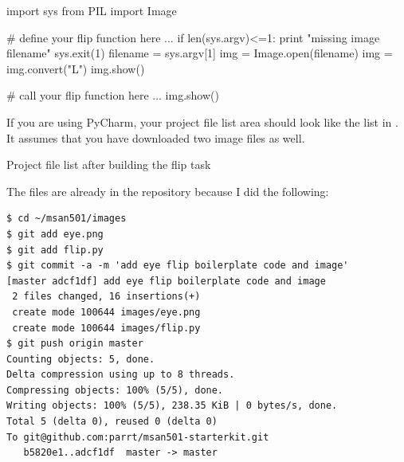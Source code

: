 \begin{pyverbatim}
import sys
from PIL import Image

# define your flip function here
...
if len(sys.argv)<=1:
	print "missing image filename"
	sys.exit(1)
filename = sys.argv[1]
img = Image.open(filename)
img = img.convert("L")
img.show()

# call your flip function here
...
img.show()
\end{pyverbatim}

If you are using PyCharm, your project file list area should look like the list in . It assumes that you have downloaded two image files as well.

\begin{marginfigure}
\begin{center}
\end{center}
\caption{Project file list after building the flip task}
\label{fliplist}
\end{marginfigure}

The files are already in the repository because I did the following:

\begin{lstlisting}[style=BashInputStyle]
$ cd ~/msan501/images
$ git add eye.png
$ git add flip.py
$ git commit -a -m 'add eye flip boilerplate code and image'
[master adcf1df] add eye flip boilerplate code and image
 2 files changed, 16 insertions(+)
 create mode 100644 images/eye.png
 create mode 100644 images/flip.py
$ git push origin master
Counting objects: 5, done.
Delta compression using up to 8 threads.
Compressing objects: 100% (5/5), done.
Writing objects: 100% (5/5), 238.35 KiB | 0 bytes/s, done.
Total 5 (delta 0), reused 0 (delta 0)
To git@github.com:parrt/msan501-starterkit.git
   b5820e1..adcf1df  master -> master
\end{lstlisting}

